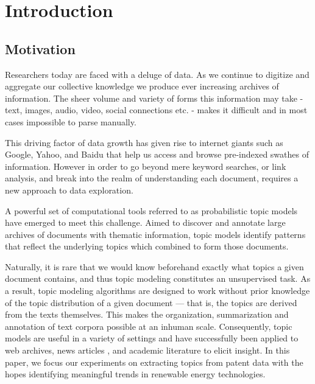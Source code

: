 
\chapter{Introduction} %

\label{Chapter1} %

\newcommand{\keyword}[1]{\textbf{#1}}
\newcommand{\tabhead}[1]{\textbf{#1}}
\newcommand{\code}[1]{\texttt{#1}}
\newcommand{\file}[1]{\texttt{\bfseries#1}}
\newcommand{\option}[1]{\texttt{\itshape#1}}


\section{Motivation}
Researchers today are faced with a deluge of data. As we continue to digitize and aggregate our collective knowledge we produce ever increasing archives of information. The sheer volume and variety of forms this information may take - text, images, audio, video, social connections etc. - makes it difficult and in most cases impossible to parse manually. 

This driving factor of data growth has given rise to internet giants such as Google, Yahoo, and Baidu that help us access and browse pre-indexed swathes of information. However in order to go beyond mere keyword searches, or link analysis, and break into the realm of understanding each document, requires a new approach to data exploration.

A powerful set of computational tools referred to as probabilistic topic models have emerged to meet this challenge. Aimed to discover and annotate large archives of documents with thematic information, topic models identify patterns that reflect the underlying topics which combined to form those documents.

Naturally, it is rare that we would know beforehand exactly what topics a given document contains, and thus topic modeling constitutes an unsupervised task. As a result, topic modeling algorithms are designed to work without prior knowledge of the topic distribution of a given document — that is, the topics are derived from the texts themselves. This makes the organization, summarization and annotation of text corpora possible at an inhuman scale. Consequently, topic models are useful in a variety of settings and have successfully been applied to web archives, news articles \parencite{Newman:2006:AET:2106961.2106971}, and academic literature \parencite{Steyvers:2004:PAM:1014052.1014087} to elicit insight. In this paper, we focus our experiments on extracting topics from patent data with the hopes identifying meaningful trends in renewable energy technologies. 

